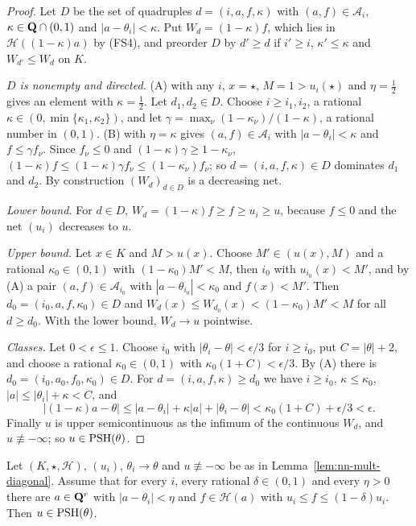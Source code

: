 \begin{proof}
Let $D$ be the set of quadruples $d=(i,a,f,\kappa)$ with $(a,f)\in\mathcal A_i$, $\kappa\in\mathbf{Q}\cap(0,1)$ and $|a-\theta_i|<\kappa$. Put
$W_d=(1-\kappa)f$, which lies in $\mathcal H((1-\kappa)a)$ by (FS4), and preorder $D$ by $d'\ge d$ if $i'\ge i$, $\kappa'\le\kappa$ and
$W_{d'}\le W_d$ on $K$.

\emph{$D$ is nonempty and directed.} (A) with any $i$, $x=\star$, $M=1>u_i(\star)$ and $\eta=\frac12$ gives an element with
$\kappa=\frac12$. Let $d_1,d_2\in D$. Choose $i\ge i_1,i_2$, a rational $\kappa\in(0,\min\{\kappa_1,\kappa_2\})$, and let
$\gamma=\max_\nu(1-\kappa_\nu)/(1-\kappa)$, a rational number in $(0,1)$. (B) with $\eta=\kappa$ gives $(a,f)\in\mathcal A_i$ with
$|a-\theta_i|<\kappa$ and $f\le\gamma f_\nu$. Since $f_\nu\le0$ and $(1-\kappa)\gamma\ge1-\kappa_\nu$,
$(1-\kappa)f\le(1-\kappa)\gamma f_\nu\le(1-\kappa_\nu)f_\nu$; so $d=(i,a,f,\kappa)\in D$ dominates $d_1$ and $d_2$. By construction
$(W_d)_{d\in D}$ is a decreasing net.

\emph{Lower bound.} For $d\in D$, $W_d=(1-\kappa)f\ge f\ge u_i\ge u$, because $f\le0$ and the net $(u_i)$ decreases to $u$.

\emph{Upper bound.} Let $x\in K$ and $M>u(x)$. Choose $M'\in(u(x),M)$ and a rational $\kappa_0\in(0,1)$ with $(1-\kappa_0)M'<M$, then
$i_0$ with $u_{i_0}(x)<M'$, and by (A) a pair $(a,f)\in\mathcal A_{i_0}$ with $|a-\theta_{i_0}|<\kappa_0$ and $f(x)<M'$. Then
$d_0=(i_0,a,f,\kappa_0)\in D$ and $W_d(x)\le W_{d_0}(x)<(1-\kappa_0)M'<M$ for all $d\ge d_0$. With the lower bound, $W_d\to u$
pointwise.

\emph{Classes.} Let $0<\epsilon\le1$. Choose $i_0$ with $|\theta_i-\theta|<\epsilon/3$ for $i\ge i_0$, put $C=|\theta|+2$, and choose a rational
$\kappa_0\in(0,1)$ with $\kappa_0(1+C)<\epsilon/3$. By (A) there is $d_0=(i_0,a_0,f_0,\kappa_0)\in D$. For $d=(i,a,f,\kappa)\ge d_0$ we have
$i\ge i_0$, $\kappa\le\kappa_0$, $|a|\le|\theta_i|+\kappa<C$, and
\[
|(1-\kappa)a-\theta|\le|a-\theta_i|+\kappa|a|+|\theta_i-\theta|<\kappa_0(1+C)+\epsilon/3<\epsilon.
\]
Finally $u$ is upper semicontinuous as the infimum of the continuous $W_d$, and $u\not\equiv-\infty$; so $u\in\operatorname{PSH}(\theta)$.
\end{proof}

\begin{corollary}\label{cor:nn-sandwich-diagonal}
\leanok
{}
Let $(K,\star,\mathcal H)$, $(u_i)$, $\theta_i\to\theta$ and $u\not\equiv-\infty$ be as in Lemma~\ref{lem:nn-mult-diagonal}. Assume that for every
$i$, every rational $\delta\in(0,1)$ and every $\eta>0$ there are $a\in\mathbf{Q}^r$ with $|a-\theta_i|<\eta$ and $f\in\mathcal H(a)$ with
$u_i\le f\le(1-\delta)u_i$. Then $u\in\operatorname{PSH}(\theta)$.
\end{corollary}

